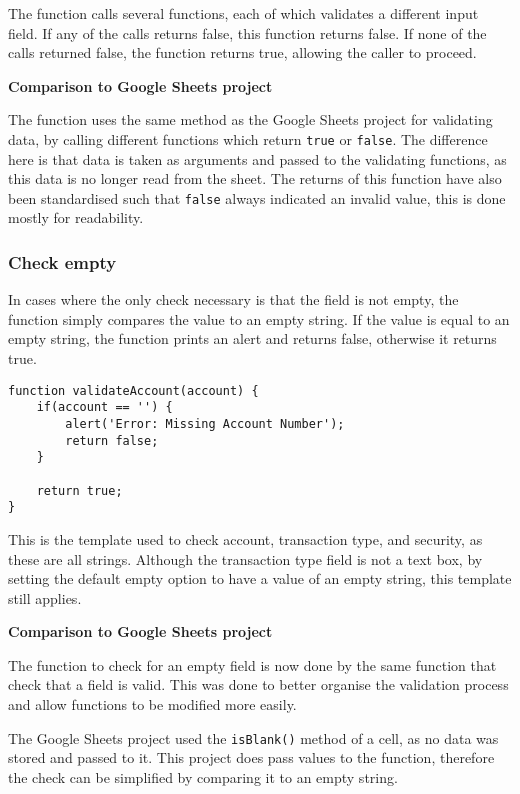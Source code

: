 \documentclass[letterpaper]{article}
\begin{document}
The function calls several functions, each of which validates a different input field.
If any of the calls returns false, this function returns false.
If none of the calls returned false, the function returns true, allowing the caller to proceed.

\textbf{Comparison to Google Sheets project}

The function uses the same method as the Google Sheets project for validating data, by calling different functions which return \lstinline{true} or \lstinline{false}.
The difference here is that data is taken as arguments and passed to the validating functions, as this data is no longer read from the sheet.
The returns of this function have also been standardised such that \lstinline{false} always indicated an invalid value, this is done mostly for readability.

\subsubsection{Check empty}

In cases where the only check necessary is that the field is not empty, the function simply compares the value to an empty string.
If the value is equal to an empty string, the function prints an alert and returns false, otherwise it returns true.

\begin{lstlisting}[firstnumber=54]
function validateAccount(account) {
    if(account == '') {
        alert('Error: Missing Account Number');
        return false;
    }

    return true;
}
\end{lstlisting}

This is the template used to check account, transaction type, and security, as these are all strings.
Although the transaction type field is not a text box, by setting the default empty option to have a value of an empty string, this template still applies.

\textbf{Comparison to Google Sheets project}

The function to check for an empty field is now done by the same function that check that a field is valid.
This was done to better organise the validation process and allow functions to be modified more easily.

The Google Sheets project used the \lstinline{isBlank()} method of a cell, as no data was stored and passed to it.
This project does pass values to the function, therefore the check can be simplified by comparing it to an empty string.
\end{document}
